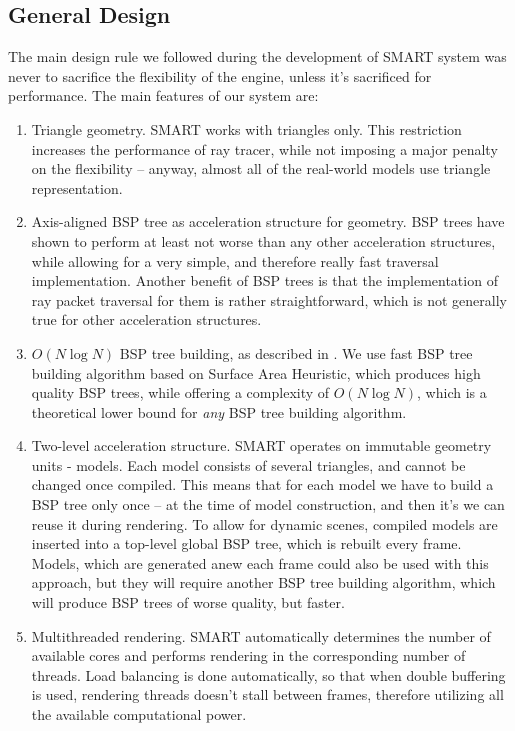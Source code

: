 \documentclass{article}
\begin{document}
\subsection{General Design}
The main design rule we followed during the development of SMART system was never to sacrifice the flexibility of the engine, unless it's sacrificed for performance. The main features of our system are:

\begin{enumerate}
\item Triangle geometry. SMART works with triangles only. This restriction increases the performance of ray tracer, while not imposing a major penalty on the flexibility -- anyway, almost all of the real-world models use triangle representation.
\item Axis-aligned BSP tree as acceleration structure for geometry. BSP trees have shown to perform at least not worse than any other acceleration structures, while allowing for a very simple, and therefore really fast traversal implementation. Another benefit of BSP trees is that the implementation of ray packet traversal for them is rather straightforward, which is not generally true for other acceleration structures.
\item $O(N\log{N})$ BSP tree building, as described in \cite{wald06}. We use fast BSP tree building algorithm based on Surface Area Heuristic, which produces high quality BSP trees, while offering a complexity of $O(N\log{N})$, which is a theoretical lower bound for {\it any} BSP tree building algorithm.
\item Two-level acceleration structure. SMART operates on immutable geometry units - models. Each model consists of several triangles, and cannot be changed once compiled. This means that for each model we have to build a BSP tree only once -- at the time of model construction, and then it's we can reuse it during rendering. To allow for dynamic scenes, compiled models are inserted into a top-level global BSP tree, which is rebuilt every frame. Models, which are generated anew each frame could also be used with this approach, but they will require another BSP tree building algorithm, which will produce BSP trees of worse quality, but faster.
\item Multithreaded rendering. SMART automatically determines the number of available cores and performs rendering in the corresponding number of threads. Load balancing is done automatically, so that when double buffering is used, rendering threads doesn't stall between frames, therefore utilizing all the available computational power.

\end{enumerate}
\end{document}
